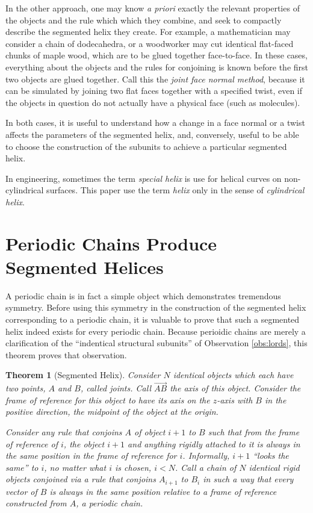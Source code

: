 \documentclass[11pt]{article}
\newtheorem{theorem}{Theorem}
\begin{document}
{In the other approach, one may know {\it a priori} exactly the
relevant properties of the objects and the rule which which they combine,
and seek to compactly describe the segmented helix they create.
For example, a mathematician may consider a chain of dodecahedra,
or a woodworker may cut identical flat-faced chunks of maple wood,
which are to be glued together face-to-face.
In these cases, everything about the objects and the rules for conjoining
is known before the first two objects are glued together.
Call this the {\em joint face normal method}, because
it can be simulated by joining two flat faces together with a specified twist,
even if the objects in question
do not actually have a physical face (such as molecules).

In both cases, it is useful to understand how a change in a face normal
or a twist affects the parameters
of the segmented helix,
and, conversely, useful to be able to choose the construction
of the subunits to achieve a particular segmented helix.

In engineering, sometimes the term {\em special helix}\cite{gu2012research} is use for helical curves on non-cylindrical surfaces. This paper use the term {\em helix} only in the sense of {\em cylindrical helix}.

\section{Periodic Chains Produce Segmented Helices}

A periodic chain is in fact a simple object which demonstrates tremendous symmetry.
Before using this symmetry in the construction of the segmented helix corresponding to a periodic chain,
it is valuable to
prove that such a segmented helix indeed exists for every periodic chain.
Because perioidic chains are merely a clarification of the ``indentical structural subunits''
of Observation \ref{obs:lords},
this theorem proves that observation.

\begin{theorem}[Segmented Helix]
  \label{thm:helix}
  Consider $N$ identical objects which each have two points, $A$ and $B$, called {\em joints}. Call
  $\overrightarrow{AB}$ the {\em axis} of this object.
  Consider the frame of reference for this object to have
  its axis on the $z$-axis with $B$ in the positive direction, the
  midpoint of the object at the origin.

  Consider any rule that conjoins $A$ of object $i+1$ to $B$ such that
  from the frame of reference of $i$, the object $i+1$ and anything rigidly
  attached to it is always in the same position in the frame of reference for $i$.
  Informally, $i+1$ ``looks the same'' to $i$, no matter what $i$ is chosen, $i < N$.
  Call a chain of $N$ identical rigid objects conjoined via a rule that
  conjoins $A_{i+1}$ to $B_i$ in such a way that every vector
  of $B$ is always in the same position relative to a frame of reference
  constructed from $A$, a {\em periodic chain.}


\end{theorem}}
\end{document}
